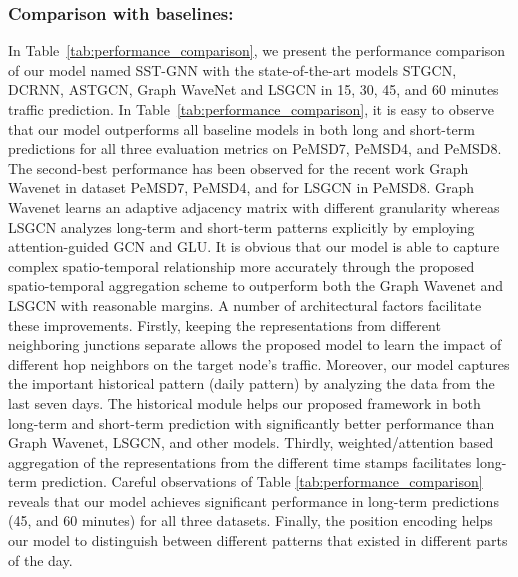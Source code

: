 \documentclass[runningheads]{llncs}
\begin{document}
\subsubsection{Comparison with baselines:}
In Table~\ref{tab:performance_comparison}, we present the performance comparison of our model named SST-GNN with the state-of-the-art models STGCN, DCRNN, ASTGCN, Graph WaveNet and LSGCN in 15, 30, 45, and 60 minutes traffic prediction. 
In Table~\ref{tab:performance_comparison}, it is easy to observe that our model outperforms all baseline models in both long and short-term predictions for all three evaluation metrics on PeMSD7, PeMSD4, and PeMSD8. The second-best performance has been observed for the recent work
Graph Wavenet in dataset PeMSD7, PeMSD4, and for LSGCN in PeMSD8.
Graph Wavenet learns an adaptive adjacency matrix with different granularity whereas LSGCN analyzes long-term and short-term patterns explicitly by employing attention-guided GCN and GLU. It is obvious that our model is able to capture complex spatio-temporal relationship more accurately through the proposed spatio-temporal aggregation scheme to outperform both the Graph Wavenet and LSGCN with reasonable margins. A number of architectural factors facilitate these improvements. Firstly, keeping the representations from different neighboring junctions separate allows the proposed model to learn the impact of different hop neighbors on the target node's traffic. Moreover,  our model captures the important historical pattern (daily pattern) by analyzing the data from the last seven days. The historical module helps our proposed framework in both long-term and short-term prediction with significantly better performance than Graph Wavenet, LSGCN, and other models.   Thirdly, weighted/attention based aggregation of the representations from the different time stamps facilitates long-term prediction. Careful observations of Table \ref{tab:performance_comparison} reveals that our model achieves significant performance in long-term predictions (45, and 60 minutes) for all three datasets. Finally, the position encoding helps our model to distinguish between different patterns that existed in different parts of the day. 
\end{document}
